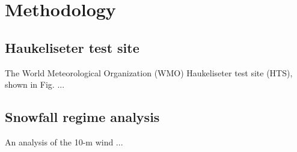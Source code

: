 \chapter{Methodology}\label{ch:methodology}
	\section{Haukeliseter test site}\label{sec:HTS}

    The World Meteorological Organization (WMO) Haukeliseter test site (HTS), shown in Fig. ...

    \section{Snowfall regime analysis}\label{sec:snowfall_regime}
    An analysis of the 10-m wind ...